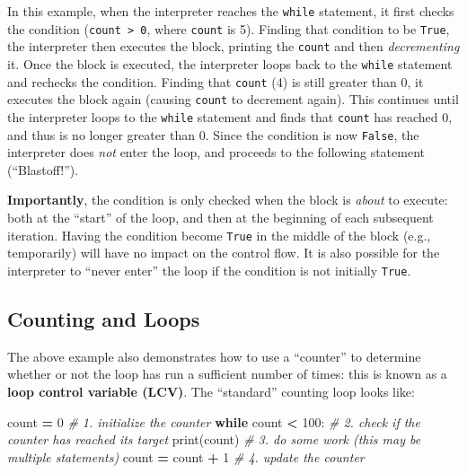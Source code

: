\documentclass[]{book}
\newenvironment{Shaded}{\begin{snugshade}}{\end{snugshade}}
\newcommand{\DecValTok}[1]{\textcolor[rgb]{0.00,0.00,0.81}{#1}}
\newcommand{\CommentTok}[1]{\textcolor[rgb]{0.56,0.35,0.01}{\textit{#1}}}
\newcommand{\ControlFlowTok}[1]{\textcolor[rgb]{0.13,0.29,0.53}{\textbf{#1}}}
\newcommand{\OperatorTok}[1]{\textcolor[rgb]{0.81,0.36,0.00}{\textbf{#1}}}
\newcommand{\BuiltInTok}[1]{#1}
\newcommand{\NormalTok}[1]{#1}
\begin{document}
In this example, when the interpreter reaches the \texttt{while}
statement, it first checks the condition
(\texttt{count\ \textgreater{}\ 0}, where \texttt{count} is 5). Finding
that condition to be \texttt{True}, the interpreter then executes the
block, printing the \texttt{count} and then \emph{decrementing} it. Once
the block is executed, the interpreter loops back to the \texttt{while}
statement and rechecks the condition. Finding that \texttt{count} (4) is
still greater than 0, it executes the block again (causing
\texttt{count} to decrement again). This continues until the interpreter
loops to the \texttt{while} statement and finds that \texttt{count} has
reached 0, and thus is no longer greater than 0. Since the condition is
now \texttt{False}, the interpreter does \emph{not} enter the loop, and
proceeds to the following statement (``Blastoff!'').

\textbf{Importantly}, the condition is only checked when the block is
\emph{about} to execute: both at the ``start'' of the loop, and then at
the beginning of each subsequent iteration. Having the condition become
\texttt{True} in the middle of the block (e.g., temporarily) will have
no impact on the control flow. It is also possible for the interpreter
to ``never enter'' the loop if the condition is not initially
\texttt{True}.

\hypertarget{counting-and-loops}{\subsection{Counting and
Loops}\label{counting-and-loops}}

The above example also demonstrates how to use a ``counter'' to
determine whether or not the loop has run a sufficient number of times:
this is known as a \textbf{loop control variable (LCV)}. The
``standard'' counting loop looks like:

\begin{Shaded}
\begin{Highlighting}[]
\NormalTok{count }\OperatorTok{=} \DecValTok{0}  \CommentTok{# 1. initialize the counter}
\ControlFlowTok{while}\NormalTok{ count }\OperatorTok{<} \DecValTok{100}\NormalTok{:  }\CommentTok{# 2. check if the counter has reached its target}
    \BuiltInTok{print}\NormalTok{(count)  }\CommentTok{# 3. do some work (this may be multiple statements)}
\NormalTok{    count }\OperatorTok{=}\NormalTok{ count }\OperatorTok{+} \DecValTok{1}  \CommentTok{# 4. update the counter}
\end{Highlighting}
\end{Shaded}
\end{document}
